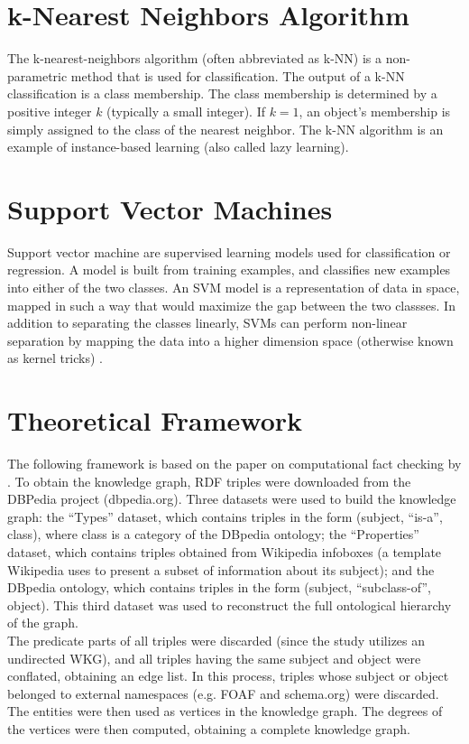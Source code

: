 \documentclass[10pt,11pt,12pt,oneside]{book}
\begin{document}
	\section{k-Nearest Neighbors Algorithm}
	The k-nearest-neighbors algorithm (often abbreviated as k-NN) is a non-parametric method that is used for classification. The output of a k-NN classification is a class membership. The class membership is determined by a positive integer $k$ (typically a small integer). If $k = 1$, an object’s membership is simply assigned to the class of the nearest neighbor. The k-NN algorithm is an example of instance-based learning (also called lazy learning).
	
	\section{Support Vector Machines}
	Support vector machine are supervised learning models used for classification or regression. A model is built from training examples, and classifies new examples into either of the two classes. An SVM model is a representation of data in space, mapped in such a way that would maximize the gap between the two classses. In addition to separating the classes linearly, SVMs can perform non-linear separation by mapping the data into a higher dimension space (otherwise known as kernel tricks) \cite{Cortes1995}. 
	
	
	\section{Theoretical Framework}
	
	The following framework is based on the paper on computational fact checking by \cite{ciampaglia2015computational}. To obtain the knowledge graph, RDF triples were downloaded from the DBPedia project (dbpedia.org). Three datasets were used to build the knowledge graph: the “Types” dataset, which contains triples in the form (subject, “is-a”, class), where class is a category of the DBpedia ontology; the “Properties” dataset, which contains triples obtained from Wikipedia infoboxes (a template Wikipedia uses to present a subset of information about its subject); and the DBpedia ontology, which contains triples in the form (subject, “subclass-of”, object). This third dataset was used to reconstruct the full ontological hierarchy of the graph.\\
	
	The predicate parts of all triples were discarded (since the study utilizes an undirected WKG), and all triples having the same subject and object were conflated, obtaining an edge list. In this process, triples whose subject or object belonged to external namespaces (e.g. FOAF and schema.org) were discarded. The entities were then used as vertices in the knowledge graph. The degrees of the vertices were then computed, obtaining a complete knowledge graph.\\
	
\end{document}
